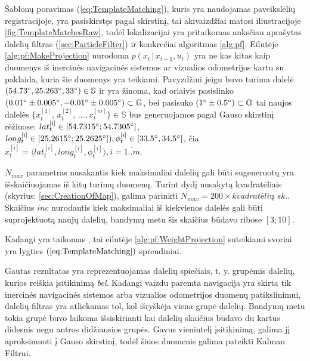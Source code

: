 \documentclass[a4paper,12pt]{article}
\begin{document}
			 Šablonų poravimas (\ref{eq:TemplateMatching}), kuris yra naudojamas paveikslėlių registracijoje, yra pasiskirstęs pagal  skirstinį, tai akivaizdžiai matosi iliustracijoje \ref{fig:TemplateMatchesRaw}, todėl lokalizacijai yra pritaikomas anksčiau aprašytas dalelių filtras (\ref{sec:ParticleFilter}) ir konkrečiai algoritmas \ref{alg:pf}.			
			Eilutėje \ref{alg:pf:MakeProjection} nurodoma $p(x_t \,|\, x_{t-1}, u_t)$ yra ne kas kitas kaip duomenys iš inercinės navigacinės sistemos ar vizualios odometrijos kartu su paklaida, kuria šie duomenys yra teikiami.
			Pavyzdžiui jeigu buvo turima dalelė $(54.73\degree, 25.263\degree, 33\degree) \in \mathbb{S}$ ir yra žinoma, kad orlaivis pasislinko $(0.01\degree \pm 0.005\degree, -0.01\degree \pm 0.005\degree) \subset \mathbb{G}$, bei pasisuko $(1\degree \pm 0.5\degree) \subset \mathbb{O}$ tai naujos dalelės $ \{ x_t^{[1]},\, x_t^{[2]},\, \dots, x_t^{[m]}\} \in \mathbb{S}$ bus generuojamos pagal Gauso skirstinį rėžiuose:  $lat_t^{[i]} \in [54.7315\degree;54.7305\degree]$, $long_t^{[i]} \in [25.2615\degree;25.2625\degree]), \phi_t^{[i]} \in [33.5\degree,34.5\degree]$, čia $x_t^{[i]} = \langle lat_t^{[i]},long_t^{[i]}, \phi_t^{[i]}\rangle, i = \overline{1..m}$. 
			
			$N_{max}$ parametras nusakantis kiek maksimaliai dalelių gali būti sugeneruotų yra išskaičiuojamas iš kitų turimų duomenų. Turint  dydį nusakytą kvadratėliais (skyrius: \ref{sec:CreationOfMap}), galima parinkti $N_{max} = 200 \times \textit{kvadratėlių sk.}$. Skaičius $inc$ nurodantis kiek maksimaliai iš kiekvienos dalelės gali būti suprojektuotą naujų dalelių, bandymų metu šis skaičius būdavo ribose $[3;10]$. 
			
			Kadangi yra taikomas , tai eilutėje \ref{alg:pf:WeightProjection} suteikiami svoriai yra lygties $(\ref{eq:TemplateMatching})$ sprendiniai. 
			
			Gautas rezultatas yra reprezentuojamas dalelių spiečiais, t. y. grupėmis dalelių, kurios reiškia įsitikinimą \textit{bel}. Kadangi vaizdu paremta navigacija yra skirta tik inercinės navigacinės sistemos arba vizualios odometrijos duomenų patikslinimui, dalelių filtras yra atliekamas tol, kol išryškėja viena grupė dalelių. Bandymų metu tokia grupė buvo laikoma išsiskirianti kai dalelių skaičius būdavo du kartus didesnis negu antros didžiausios grupės. Gavus vienintelį įsitikinimą, galima jį aproksimuoti į Gauso skirstinį, todėl šiuos duomenis galima pateikti Kalman Filtrui.	 
				
\end{document}
